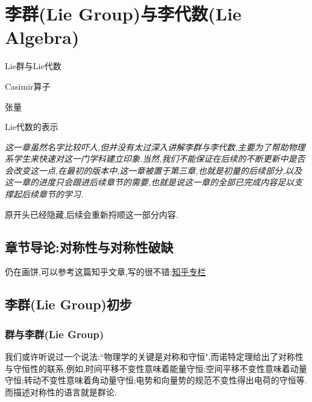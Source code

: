 \ifx\allfiles\undefined



	\else
	\fi
\chapter{李群(Lie Group)与李代数(Lie Algebra)}
\begin{introduction}
	\item Lie群与Lie代数
	\item Casimir算子
	\item 张量
	\item Lie代数的表示
\end{introduction}

\textit{这一章虽然名字比较吓人,但并没有太过深入讲解李群与李代数,主要为了帮助物理系学生来快速对这一门学科建立印象.当然,我们不能保证在后续的不断更新中是否会改变这一点,在最初的版本中,这一章被置于第三章,也就是初量的后续部分,以及这一章的进度只会跟进后续章节的需要,也就是说这一章的全部已完成内容足以支撑起后续章节的学习.}

原开头已经隐藏,后续会重新捋顺这一部分内容.

\section*{章节导论:对称性与对称性破缺}
仍在画饼,可以参考这篇知乎文章,写的很不错:\href{https://zhuanlan.zhihu.com/p/338221764}{知乎专栏}
\section{李群(Lie Group)初步}
\subsection{群与李群(Lie Group)}
我们或许听说过一个说法:``物理学的关键是对称和守恒",而诺特定理给出了对称性与守恒性的联系,例如,时间平移不变性意味着能量守恒;空间平移不变性意味着动量守恒;转动不变性意味着角动量守恒;电势和向量势的规范不变性得出电荷的守恒等.而描述对称性的语言就是群论.

